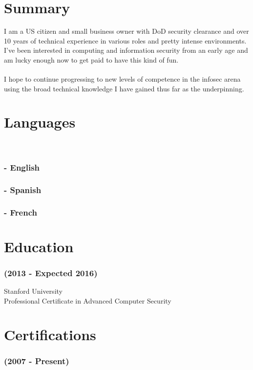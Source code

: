 \documentclass{article}
\begin{document}
\section {Summary}

I am a US citizen and small business owner with DoD security clearance and over 10 years of technical experience in various roles and pretty intense environments. I've been interested in computing and information security from an early age and am lucky enough now to get paid to have this kind of fun.\\\\I hope to continue progressing to new levels of competence in the infosec arena using the broad technical knowledge I have gained thus far as the underpinning.

\section {Languages}

\\

\subsubsection {- English \\ }


\subsubsection {- Spanish \\ }


\subsubsection {- French \\ }


\section {Education}


\subsubsection { {(2013 - Expected 2016)} }
{ Stanford University } \\
{ Professional Certificate in Advanced Computer Security }
\section {Certifications}{\noindent}\subsubsection { {(2007 - Present)} }
\end{document}
